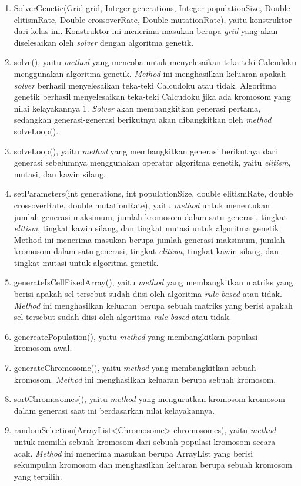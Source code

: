 \begin{enumerate}
\item SolverGenetic(Grid grid, Integer generations, Integer populationSize, Double elitismRate, Double crossoverRate, Double mutationRate), yaitu konstruktor dari kelas ini. Konstruktor ini menerima masukan berupa \textit{grid} yang akan diselesaikan oleh \textit{solver} dengan algoritma genetik.
\item solve(), yaitu \textit{method} yang mencoba untuk menyelesaikan teka-teki Calcudoku menggunakan algoritma genetik. \textit{Method} ini menghasilkan keluaran apakah \textit{solver} berhasil menyelesaikan teka-teki Calcudoku atau tidak. Algoritma genetik berhasil menyelesaikan teka-teki Calcudoku jika ada kromosom yang nilai kelayakannya 1. \textit{Solver} akan membangkitkan generasi pertama, sedangkan generasi-generasi berikutnya akan dibangkitkan oleh \textit{method} solveLoop().
\item solveLoop(), yaitu \textit{method} yang membangkitkan generasi berikutnya dari generasi sebelumnya menggunakan operator algoritma genetik, yaitu \textit{elitism}, mutasi, dan kawin silang.
\item setParameters(int generations, int populationSize, double elitismRate, double crossoverRate, double mutationRate), yaitu \textit{method} untuk menentukan jumlah generasi maksimum, jumlah kromosom dalam satu generasi, tingkat \textit{elitism}, tingkat kawin silang, dan tingkat mutasi untuk algoritma genetik. Method ini menerima masukan berupa jumlah generasi maksimum, jumlah kromosom dalam satu generasi, tingkat \textit{elitism}, tingkat kawin silang, dan tingkat mutasi untuk algoritma genetik.
\item generateIsCellFixedArray(), yaitu \textit{method} yang membangkitkan matriks yang berisi apakah sel tersebut sudah diisi oleh algoritma \textit{rule based} atau tidak. \textit{Method} ini menghasilkan keluaran berupa sebuah matriks yang berisi apakah sel tersebut sudah diisi oleh algoritma \textit{rule based} atau tidak.
\item genereatePopulation(), yaitu \textit{method} yang membangkitkan populasi kromosom awal.
\item generateChromosome(), yaitu \textit{method} yang membangkitkan sebuah kromosom. \textit{Method} ini menghasilkan keluaran berupa sebuah kromosom.
\item sortChromosomes(), yaitu \textit{method} yang mengurutkan kromosom-kromosom dalam generasi saat ini berdasarkan nilai kelayakannya.
\item randomSelection(ArrayList<Chromosome> chromosomes), yaitu \textit{method} untuk memilih sebuah kromosom dari sebuah populasi kromosom secara acak. \textit{Method} ini menerima masukan berupa ArrayList yang berisi sekumpulan kromosom dan menghasilkan keluaran berupa sebuah kromosom yang terpilih.

\end{enumerate}
